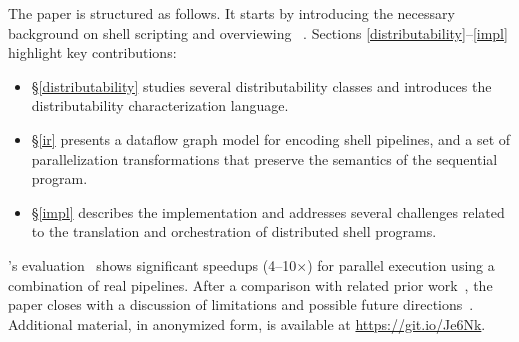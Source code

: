 \documentclass[sigplan,10pt,review,anonymous]{acmart}
\begin{document}

The paper is structured as follows.
It starts by introducing the necessary background on shell scripting and overviewing \sys~.
Sections \ref{distributability}--\ref{impl} highlight key
contributions:
\begin{itemize}

  \item
  \S\ref{distributability} studies several distributability classes and introduces the distributability characterization language.

  \item
  \S\ref{ir} presents a dataflow graph model for encoding shell pipelines, and a set of parallelization transformations that preserve the semantics of the sequential program.

  \item
    \S\ref{impl} describes the \sys implementation and addresses several challenges related to the translation and orchestration of distributed shell programs.
\end{itemize}

\noindent
\sys's evaluation~ shows significant speedups (4--10$\times$) for parallel execution using a combination of real pipelines. %
After a comparison with related prior work~, the paper closes with a discussion of limitations and possible future directions~.
Additional material, in anonymized form, is available at
\href{https://git.io/Je6Nk}{https://git.io/Je6Nk}.

% 
\end{document}
